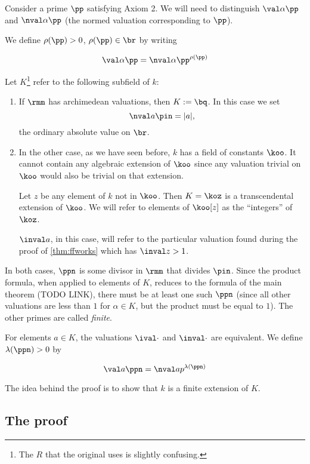 Consider a prime $\pp$ satisfying Axiom 2. We will need to distinguish $\val
\alpha \pp$ and $\nval \alpha \pp$ (the normed valuation corresponding to
$\pp$).

We define $\rho(\pp) > 0$, $\rho(\pp) \in \br$ by writing

\[ \val \alpha \pp = \nval \alpha \pp ^{\rho(\pp)} \]

Let $K$\footnote{The $R$ that the original uses is slightly confusing.} refer to
the following subfield of $k$:

\begin{enumerate}
\item If $\rmm$ has archimedean valuations, then $K := \bq$. In this case we set
  \[ \nval a \pin = |a|, \]
  the ordinary absolute value on $\br$.

\item In the other case, as we have seen before, $k$ has a field of constants
  $\koo$. It cannot contain any algebraic extension of $\koo$ since any
  valuation trivial on $\koo$ would also be trivial on that extension.

  Let $z$ be any element of $k$ not in $\koo$. Then $K = \koz$ is a
  transcendental extension of $\koo$. We will refer to elements of $\koo[z]$ as
  the ``integers'' of $\koz$.

  $\inval a$, in this case, will refer to the particular valuation found during
  the proof of \ref{thm:ffworks} which has $\inval z > 1$.
\end{enumerate}

In both cases, $\ppn$ is some divisor in $\rmm$ that divides $\pin$. Since the
product formula, when applied to elements of $K$, reduces to the formula of the
main theorem (TODO LINK), there must be at least one such $\ppn$ (since all
other valuations are less than $1$ for $\alpha\in K$, but the product must be
equal to $1$). The other primes are called \textit{finite}.

For elements $a\in K$, the valuations $\ival\cdot$ and $\inval\cdot$ are
equivalent. We define $\lambda(\ppn) > 0$ by

\[ \val a \ppn = \nval a p ^{\lambda(\ppn)} \]

The idea behind the proof is to show that $k$ is a finite extension of $K$.

\subsection{The proof}

